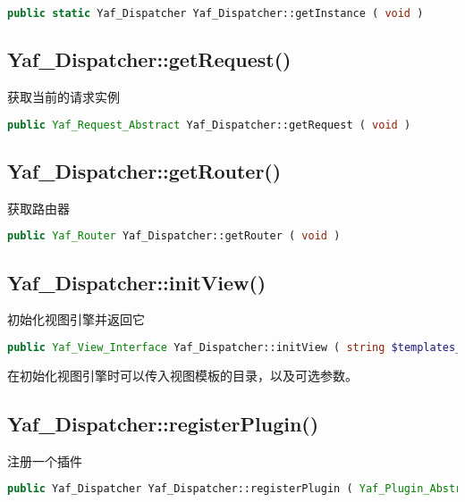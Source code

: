 \begin{lstlisting}[language=PHP]
public static Yaf_Dispatcher Yaf_Dispatcher::getInstance ( void )
\end{lstlisting}



\subsection{Yaf\_Dispatcher::getRequest()}


获取当前的请求实例

\begin{lstlisting}[language=PHP]
public Yaf_Request_Abstract Yaf_Dispatcher::getRequest ( void )
\end{lstlisting}





\subsection{Yaf\_Dispatcher::getRouter()}

获取路由器


\begin{lstlisting}[language=PHP]
public Yaf_Router Yaf_Dispatcher::getRouter ( void )
\end{lstlisting}





\subsection{Yaf\_Dispatcher::initView()}

初始化视图引擎并返回它


\begin{lstlisting}[language=PHP]
public Yaf_View_Interface Yaf_Dispatcher::initView ( string $templates_dir [, array $options ] )
\end{lstlisting}

在初始化视图引擎时可以传入视图模板的目录，以及可选参数。



\subsection{Yaf\_Dispatcher::registerPlugin()}


注册一个插件


\begin{lstlisting}[language=PHP]
public Yaf_Dispatcher Yaf_Dispatcher::registerPlugin ( Yaf_Plugin_Abstract $plugin )
\end{lstlisting}


